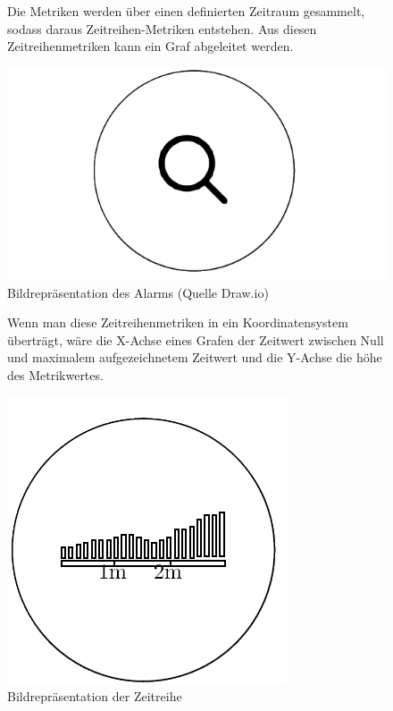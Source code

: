 \documentclass[a4paper,10pt]{scrartcl}
\begin{document}
\begin{figure}[htbp]
\begin{minipage}[t]{6cm}
\vspace{0pt}
Die Metriken werden über einen definierten Zeitraum gesammelt, sodass daraus Zeitreihen-Metriken entstehen. Aus diesen Zeitreihenmetriken kann ein Graf abgeleitet werden.\\
\end{minipage}
\hfill
\begin{minipage}[t]{6cm}
\vspace{0pt}
\centering
  \includegraphics[scale=.3]{img/Datenaggregation/LupeNew.png} 
\caption{Bildrepräsentation des Alarms (Quelle Draw.io)}
\label{fig:Bild1}
\end{minipage}
\end{figure}

\begin{figure}[htbp]
\begin{minipage}[t]{6cm}
\vspace{0pt}
Wenn man diese Zeitreihenmetriken in ein Koordinatensystem überträgt, wäre die X-Achse eines Grafen der Zeitwert zwischen Null und maximalem aufgezeichnetem Zeitwert und die Y-Achse die höhe des Metrikwertes. \\
\end{minipage}
\hfill
\begin{minipage}[t]{6cm}
\vspace{0pt}
\centering
  \includegraphics[scale=.3]{img/Datenaggregation/GrafAggregationNew.png}
\caption{Bildrepräsentation der Zeitreihe}
\label{fig:Bild1}
\end{minipage}
\end{figure}
\end{document}
